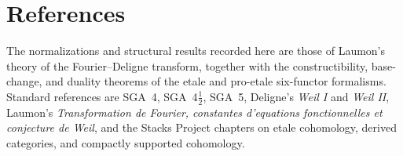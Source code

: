 \documentclass[10pt]{article}
\theoremstyle{definition}
\begin{document}
\section{References}

The normalizations and structural results recorded here are those of
Laumon's theory of the Fourier--Deligne transform, together with the
constructibility, base-change, and duality theorems of the etale and
pro-etale six-functor formalisms.  Standard references are SGA~4,
SGA~4\(\frac12\), SGA~5, Deligne's \emph{Weil I} and \emph{Weil II},
Laumon's \emph{Transformation de Fourier, constantes d'equations
fonctionnelles et conjecture de Weil}, and the Stacks Project chapters on
etale cohomology, derived categories, and compactly supported cohomology.
\end{document}
